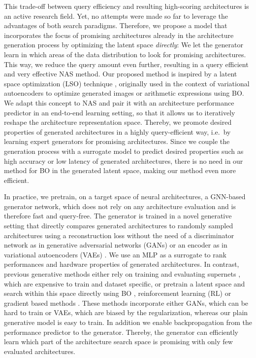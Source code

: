 \documentclass[runningheads]{llncs}
\begin{document}
This trade-off between query efficiency and resulting high-scoring architectures is an active research field. Yet, no attempts were made so far to leverage the advantages of both search paradigms. Therefore, we propose a model that incorporates the focus of promising architectures already in the architecture generation process by optimizing the latent space \textit{directly}: We let the generator learn in which areas of the data distribution to look for promising architectures. This way, we reduce the query amount even further, resulting in a query efficient and very effective NAS method. 
Our proposed method is inspired by a latent space optimization (LSO) technique \cite{2020Reweighting}, originally used in the context of variational autoencoders \cite{2014VAE} to optimize generated images or arithmetic expressions using BO. We adapt this concept to NAS and pair it with an architecture performance predictor in an end-to-end learning setting, so that it allows us to iteratively reshape the architecture representation space. Thereby, we promote desired properties of generated architectures in a highly query-efficient way, i.e.~by learning expert generators for promising architectures.
Since we couple the generation process with a surrogate model to predict desired properties such as high accuracy or low latency of generated architectures, there is no need in our method for BO in the generated latent space, making our method even more efficient. 

In practice, we pretrain, on a target space of neural architectures, a GNN-based generator network, which does not rely on any architecture evaluation and is therefore fast and query-free. 
The generator is trained in a novel generative setting that directly compares generated architectures to randomly sampled architectures using a reconstruction loss without the need of a discriminator network as in generative adversarial networks (GANs) \cite{2014GAN} or an encoder as in variational autoencoders (VAEs) \cite{2014VAE}.
We use an MLP as a surrogate to rank performances and hardware properties of generated architectures. In contrast, previous generative methods either rely on training and evaluating supernets \cite{2021SGNAS}, which are expensive to train and dataset specific, or pretrain a latent space and search within this space directly using BO \cite{2019VAENAS,2020Arch2vec,2021SVGe}, reinforcement learning (RL) \cite{2021GANAS} or gradient based methods \cite{2018NAO}. These methods incorporate either GANs, which can be hard to train or VAEs, which are biased by the regularization, whereas our plain generative model is easy to train. 
In addition we enable backpropagation from the performance predictor to the generator. Thereby, the generator can efficiently learn which part of the architecture search space is promising with only few evaluated architectures.
\end{document}

